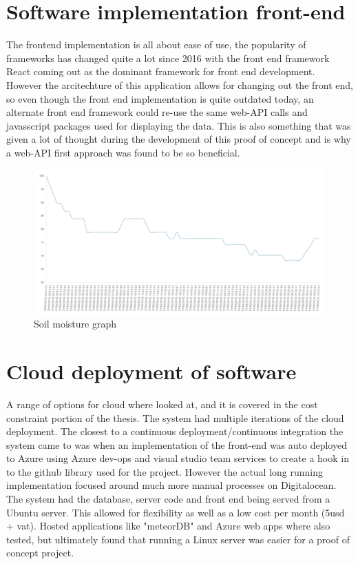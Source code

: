 \documentclass[]{uiophd}
\begin{document}
\section{Software implementation front-end}
The frontend implementation is all about ease of use, the popularity of frameworks has changed quite a lot since 2016 with the front end framework React coming out as the dominant framework for front end development. However the arcitechture of this application allows for changing out the front end, so even though the front end implementation is quite outdated today, an alternate front end framework could re-use the same web-API calls and javasscript packages used for displaying the data. This is also something that was given a lot of thought during the development of this proof of concept and is why a web-API first approach was found to be so beneficial. 

 \begin{figure}[h]
\caption{Soil moisture graph}
\centering
\includegraphics[width=12cm]{watergraph.png}
\end{figure}

\section{Cloud deployment of software}
A range of options for cloud where looked at, and it is covered in the cost constraint portion of the thesis. The system had multiple iterations of the cloud deployment. The closest to a continuous deployment/continuous integration the system came to was when an implementation of the front-end was auto deployed to Azure using Azure dev-ops and visual studio team services to create a hook in to the github library used for the project. However the actual long running implementation focused around much more manual processes on Digitalocean. The system had the database, server code and front end being served from a Ubuntu server. This allowed for flexibility as well as a low cost per month (5usd + vat). Hosted applications like "meteorDB" and Azure web apps where also tested, but ultimately found that running a Linux server was easier for a proof of concept project.
\end{document}
